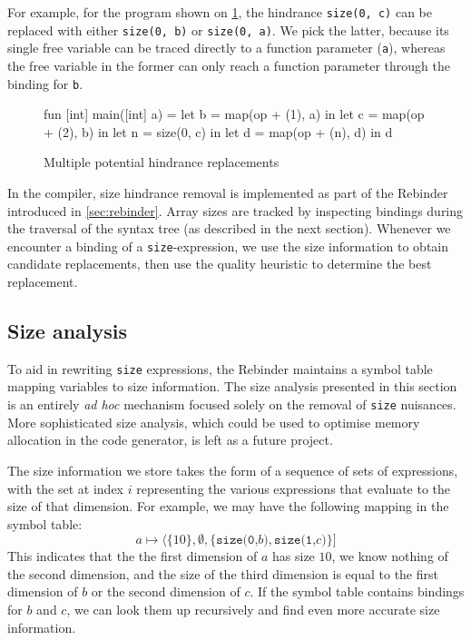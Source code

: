 For example, for the program shown on
\cref{fig:multiple-replacements}, the hindrance \texttt{size(0, c)}
can be replaced with either \texttt{size(0, b)} or \texttt{size(0,
  a)}.  We pick the latter, because its single free variable can be
traced directly to a function parameter (\texttt{a}), whereas the free
variable in the former can only reach a function parameter through the
binding for \texttt{b}.

\begin{figure}
\begin{center}
\begin{bcolorcode}
fun [int] main([int] a) =
  let b = map(op + (1), a) in
  let c = map(op + (2), b) in
  let n = size(0, c) in
  let d = map(op + (n), d) in
  d
\end{bcolorcode}
\end{center}
\caption{Multiple potential hindrance replacements}
\label{fig:multiple-replacements}
\end{figure}

In the \LO{} compiler, size hindrance removal is implemented as part
of the Rebinder introduced in \cref{sec:rebinder}.  Array sizes are
tracked by inspecting bindings during the traversal of the syntax tree
(as described in the next section).  Whenever we encounter a binding
of a \texttt{size}-expression, we use the size information to obtain
candidate replacements, then use the quality heuristic to determine
the best replacement.

\subsection{Size analysis}
\label{sec:size-analysis}

To aid in rewriting \texttt{size} expressions, the Rebinder maintains
a symbol table mapping variables to size information.  The size
analysis presented in this section is an entirely \textit{ad hoc}
mechanism focused solely on the removal of \texttt{size} nuisances.
More sophisticated size analysis, which could be used to optimise
memory allocation in the code generator, is left as a future project.

The size information we store takes the form of a sequence of sets of
expressions, with the set at index $i$ representing the various
expressions that evaluate to the size of that dimension.  For example,
we may have the following mapping in the symbol table:
\[
a \mapsto \langle\{10\}, \emptyset, \{\texttt{size(0,$b$)}, \texttt{size(1,$c$)}\}]
\]
This indicates that the the first dimension of $a$ has size $10$, we
know nothing of the second dimension, and the size of the third
dimension is equal to the first dimension of $b$ or the second
dimension of $c$.  If the symbol table contains bindings for $b$ and
$c$, we can look them up recursively and find even more accurate size
information.

